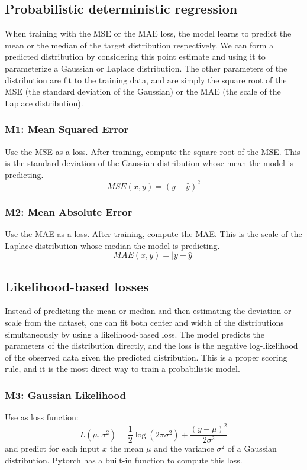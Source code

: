 \documentclass{article}
\begin{document}
\subsection{Probabilistic deterministic regression}
When training with the MSE or the MAE loss, the model learns to predict the mean or the median of the target distribution respectively. We can form a predicted distribution by considering this point estimate and using it to parameterize a Gaussian or Laplace distribution. The other parameters of the distribution are fit to the training data, and are simply the square root of the MSE (the standard deviation of the Gaussian) or the MAE (the scale of the Laplace distribution).

\subsubsection{M1: Mean Squared Error}
Use the MSE as a loss. After training, compute the square root of the MSE. This is the standard deviation of the Gaussian distribution whose mean the model is predicting. 
\begin{equation}
    MSE(x, y) = (y - \hat{y})^2
\end{equation}

\subsubsection{M2: Mean Absolute Error}
Use the MAE as a loss. After training, compute the MAE. This is the scale of the Laplace distribution whose median the model is predicting.
\begin{equation}
    MAE(x, y) = |y - \hat{y}|
\end{equation}

\subsection{Likelihood-based losses}
Instead of predicting the mean or median and then estimating the deviation or scale from the dataset, one can fit both center and width of the distributions simultaneously by using a likelihood-based loss. The model predicts the parameters of the distribution directly, and the loss is the negative log-likelihood of the observed data given the predicted distribution. This is a proper scoring rule, and it is the most direct way to train a probabilistic model.

\subsubsection{M3: Gaussian Likelihood}
Use as loss function:
\begin{equation}
    L(\mu, \sigma^2) = \frac{1}{2}\log(2\pi\sigma^2) + \frac{(y - \mu)^2}{2\sigma^2}
\end{equation}
and predict for each input $x$ the mean $\mu$ and the variance $\sigma^2$ of a Gaussian distribution.
Pytorch has a built-in function to compute this loss.
\end{document}
